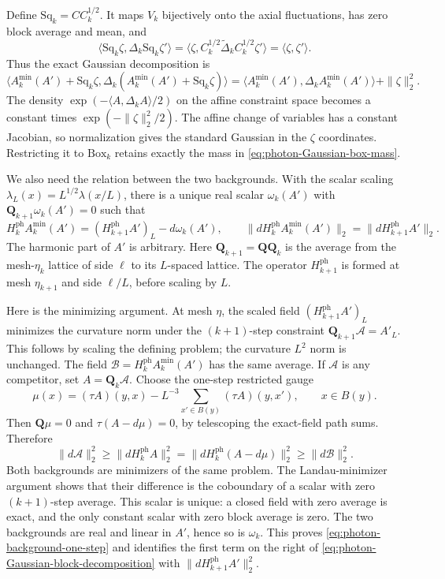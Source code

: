 \documentclass[11pt,letterpaper,reqno]{amsart}
\begin{document}
Define $\mathrm{Sq}_k=CC_k^{1/2}$. It maps $V_k$ bijectively onto
the axial fluctuations, has zero block average and mean, and
\[
 \langle\mathrm{Sq}_k\zeta,\Delta_k\mathrm{Sq}_k\zeta'\rangle
  =\langle\zeta,C_k^{1/2}\widetilde\Delta_kC_k^{1/2}\zeta'\rangle
  =\langle\zeta,\zeta'\rangle.
\]
Thus the exact Gaussian decomposition is
\begin{equation}\label{eq:photon-Gaussian-block-decomposition}
 \langle A_k^{\min}(A')+\mathrm{Sq}_k\zeta,
           \Delta_k(A_k^{\min}(A')+\mathrm{Sq}_k\zeta)\rangle
       =\langle A_k^{\min}(A'),\Delta_kA_k^{\min}(A')\rangle
                                                   +\|\zeta\|_2^2.
\end{equation}
The density $\exp(-\langle A,\Delta_kA\rangle/2)$ on the affine
constraint space becomes a constant times $\exp(-\|\zeta\|_2^2/2)$.
The affine change of variables has a constant Jacobian, so
normalization gives the standard Gaussian in the $\zeta$ coordinates.
Restricting it to $\mathrm{Box}_k$ retains exactly the mass in
\eqref{eq:photon-Gaussian-box-mass}.

We also need the relation between the two backgrounds. With the
scalar scaling $\lambda_L(x)=L^{1/2}\lambda(x/L)$, there is a
unique real scalar $\omega_k(A')$ with
$\mathbf Q_{k+1}\omega_k(A')=0$ such that
\begin{equation}\label{eq:photon-background-one-step}
 H_k^{\mathrm{ph}}A_k^{\min}(A')
       =(H_{k+1}^{\mathrm{ph}}A')_L-d\omega_k(A'),
 \qquad
 \|dH_k^{\mathrm{ph}}A_k^{\min}(A')\|_2
       =\|dH_{k+1}^{\mathrm{ph}}A'\|_2.
\end{equation}
The harmonic part of $A'$ is arbitrary.
Here $\mathbf Q_{k+1}=\mathbf Q\mathbf Q_k$ is the average from
the mesh-$\eta_k$ lattice of side $\ell$ to its $L$-spaced
lattice. The operator $H_{k+1}^{\mathrm{ph}}$ is formed at mesh
$\eta_{k+1}$ and side $\ell/L$, before scaling by $L$.

Here is the minimizing argument. At mesh $\eta$, the scaled field
$(H_{k+1}^{\mathrm{ph}}A')_L$ minimizes the curvature norm under
the $(k+1)$-step constraint $\mathbf Q_{k+1}\mathscr A=A'_L$.
This follows by scaling the defining problem; the curvature
$L^2$ norm is unchanged. The field
$\mathscr B=H_k^{\mathrm{ph}}A_k^{\min}(A')$ has the same average.
If $\mathscr A$ is any competitor, set $A=\mathbf Q_k\mathscr A$.
Choose the one-step restricted gauge
\[
 \mu(x)=(\tau A)(y,x)
            -L^{-3}\sum_{x'\in B(y)}(\tau A)(y,x'),
                 \qquad x\in B(y).
\]
Then $\mathbf Q\mu=0$ and $\tau(A-d\mu)=0$, by telescoping
the exact-field path sums. Therefore
\[
 \|d\mathscr A\|_2^2
 \ge\|dH_k^{\mathrm{ph}}A\|_2^2
 =\|dH_k^{\mathrm{ph}}(A-d\mu)\|_2^2
 \ge\|d\mathscr B\|_2^2.
\]
Both backgrounds are minimizers of the same problem. The
Landau-minimizer argument shows that their difference is the
coboundary of a scalar with zero $(k+1)$-step average. This scalar
is unique: a closed field with zero average is exact, and the
only constant scalar with zero block average is zero. The two
backgrounds are real and linear in $A'$, hence so is $\omega_k$.
This proves \eqref{eq:photon-background-one-step} and identifies
the first term on the right of
\eqref{eq:photon-Gaussian-block-decomposition} with
$\|dH_{k+1}^{\mathrm{ph}}A'\|_2^2$.
\end{document}
